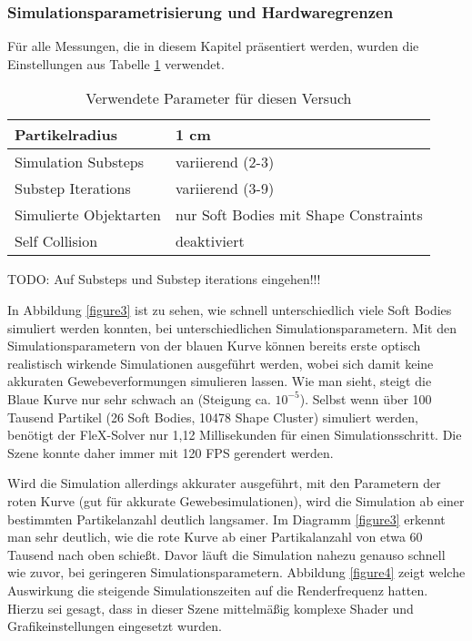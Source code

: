 \subsubsection{Simulationsparametrisierung und Hardwaregrenzen}

Für alle Messungen, die in diesem Kapitel präsentiert werden, wurden die Einstellungen aus Tabelle \ref{table_soft_param} verwendet.

\begin{table}[]
\centering
\caption{Verwendete Parameter für diesen Versuch}
\label{table_soft_param}
\begin{tabular}{l|l}
 \hline
Partikelradius & 1 cm  \\ \hline
Simulation Substeps & variierend (2-3)      \\ \hline
Substep Iterations & variierend (3-9)            \\ \hline
Simulierte Objektarten &  nur Soft Bodies mit Shape Constraints\\ \hline
Self Collision & deaktiviert \\ \hline%
\end{tabular}
\end{table}

TODO: Auf Substeps und Substep iterations eingehen!!!

In Abbildung \ref{figure3} ist zu sehen, wie schnell unterschiedlich viele Soft Bodies simuliert werden konnten, bei unterschiedlichen Simulationsparametern. %
Mit den Simulationsparametern von der blauen Kurve können bereits erste optisch realistisch wirkende Simulationen ausgeführt werden, wobei sich damit keine akkuraten Gewebeverformungen simulieren lassen. Wie man sieht, steigt die Blaue Kurve nur sehr schwach an (Steigung ca. $10^{-5}$). Selbst wenn über 100 Tausend Partikel (26 Soft Bodies, 10478 Shape Cluster) simuliert werden, benötigt der FleX-Solver nur 1,12 Millisekunden für einen Simulationsschritt. Die Szene konnte daher immer mit 120 FPS gerendert werden.


Wird die Simulation allerdings akkurater ausgeführt, mit den Parametern der roten Kurve (gut für akkurate Gewebesimulationen), wird die Simulation ab einer bestimmten Partikelanzahl deutlich langsamer. Im Diagramm \ref{figure3} erkennt man sehr deutlich, wie die rote Kurve ab einer Partikalanzahl von etwa 60 Tausend nach oben schießt. Davor läuft die Simulation nahezu genauso schnell wie zuvor, bei geringeren Simulationsparametern.
Abbildung \ref{figure4} zeigt welche Auswirkung die steigende Simulationszeiten auf die Renderfrequenz hatten. Hierzu sei gesagt, dass in dieser Szene mittelmäßig komplexe Shader und Grafikeinstellungen eingesetzt wurden.

